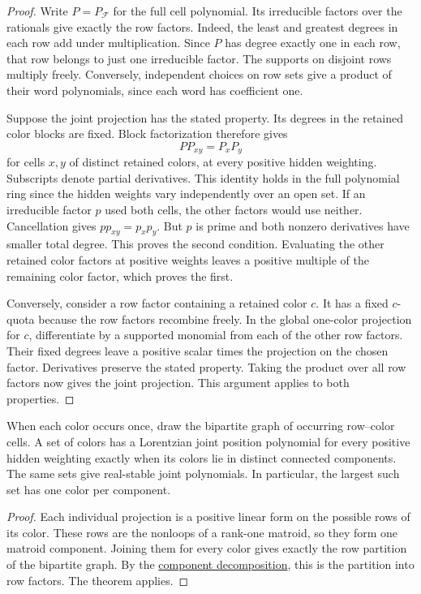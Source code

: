 \begin{proof}
Write $P=P_{\mathcal F}$ for the full cell polynomial. Its irreducible
factors over the rationals give exactly the row factors. Indeed, the
least and greatest degrees in each row add under multiplication. Since
$P$ has degree exactly one in each row, that row belongs to just one
irreducible factor. The supports on disjoint rows multiply freely.
Conversely, independent choices on row sets give a product of their
word polynomials, since each word has coefficient one.

Suppose the joint projection has the stated property. Its degrees in
the retained color blocks are fixed. Block factorization therefore gives
\[
 P P_{xy}=P_xP_y
\]
for cells $x,y$ of distinct retained colors, at every positive hidden
weighting. Subscripts denote partial derivatives. This identity holds
in the full polynomial ring since the hidden weights vary independently
over an open set. If an irreducible factor $p$ used both cells, the other
factors would use neither. Cancellation gives $p p_{xy}=p_xp_y$.
But $p$ is prime and both nonzero derivatives have smaller total degree.
This proves the second condition. Evaluating the other retained color
factors at positive weights leaves a positive multiple of the remaining
color factor, which proves the first.

Conversely, consider a row factor containing a retained color $c$.
It has a fixed $c$-quota because the row factors recombine freely.
In the global one-color projection for $c$, differentiate by a supported
monomial from each of the other row factors. Their fixed degrees leave a
positive scalar times the projection on the chosen factor. Derivatives
preserve the stated property. Taking the product over all row factors
now gives the joint projection. This argument applies to both properties.
\end{proof}

\begin{corollary}
When each color occurs once, draw the bipartite graph of occurring
row--color cells. A set of colors has a Lorentzian joint position
polynomial for every positive hidden weighting exactly when its colors
lie in distinct connected components. The same sets give real-stable
joint polynomials. In particular, the largest such set has one color
per component.
\end{corollary}

\begin{proof}
Each individual projection is a positive linear form on the possible
rows of its color. These rows are the nonloops of a rank-one matroid,
so they form one matroid component. Joining them for every color gives
exactly the row partition of the bipartite graph. By the
\href{exchange-graphs.htm#components}{component decomposition}, this
is the partition into row factors. The theorem applies.
\end{proof}

